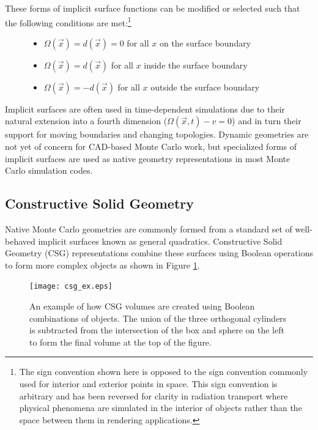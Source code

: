 \setcounter{footnote}{1}
These forms of implicit surface functions can be modified or selected such that the following
conditions are met:\footnote{The sign convention shown here is opposed to the
  sign convention commonly used for interior and exterior points in space. This
  sign convention is arbitrary and has been reversed for clarity in radiation
  transport where physical phenomena are simulated in the interior of objects
  rather than the space between them in rendering applications.}

\begin{figure}[H]
  \begin{center}
      \begin{itemize}
      \item $ \Omega(\vec{x}) = d(\vec{x}) = 0 $ for all $x$ on the surface boundary
      \item $ \Omega(\vec{x}) = d(\vec{x}) $ for all $x$ inside the surface boundary
      \item $ \Omega(\vec{x}) = -d(\vec{x}) $ for all $x$ outside the surface boundary
      \end{itemize}
  \end{center}
\end{figure}

Implicit surfaces are often used in time-dependent simulations due to their
natural extension into a fourth dimension ($ \Omega(\vec{x},t) - v  = 0 $) and
in turn their support for moving boundaries and changing topologies. Dynamic
geometries are not yet of concern for CAD-based Monte Carlo work, but
specialized forms of implicit surfaces are used as native geometry
representations in most Monte Carlo simulation codes.

\subsection{Constructive Solid Geometry}\label{subsec:csg}

Native Monte Carlo geometries are commonly formed from a standard set of
well-behaved implicit surfaces known as general quadratics. Constructive Solid
Geometry (CSG) representations combine these surfaces using Boolean operations to
form more complex objects as shown in Figure \ref{fig:csg_ex}.

\begin{figure}[h]
  \centering
  \texttt{[image: csg\_ex.eps]}
  \caption[Example of CSG Boolean operations.]{An example of how CSG volumes are created using Boolean combinations
    of objects. The union of the three orthogonal cylinders is
    subtracted from the intersection of the box and sphere on the left to form
    the final volume at the top of the figure.}
  \label{fig:csg_ex}
\end{figure}

